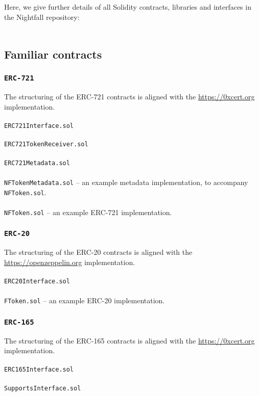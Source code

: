 \documentclass{article}
\begin{document}
Here, we give further details of all Solidity contracts, libraries and interfaces in the Nightfall repository:\\
\\
\subsection{Familiar contracts}

\subsubsection{\texttt{ERC-721}}
The structuring of the ERC-721 contracts is aligned with the \url{https://0xcert.org} implementation.\\
\\
\texttt{ERC721Interface.sol}\\
\\
\texttt{ERC721TokenReceiver.sol}\\
\\
\texttt{ERC721Metadata.sol}\\
\\
\texttt{NFTokenMetadata.sol} -- an example metadata implementation, to accompany \texttt{NFToken.sol}.\\
\\
\texttt{NFToken.sol} -- an example ERC-721 implementation.\\

\subsubsection{\texttt{ERC-20}}
The structuring of the ERC-20 contracts is aligned with the \url{https://openzeppelin.org} implementation.\\
\\
\texttt{ERC20Interface.sol}\\
\\
\texttt{FToken.sol} -- an example ERC-20 implementation.\\

\subsubsection{\texttt{ERC-165}}
The structuring of the ERC-165 contracts is aligned with the \url{https://0xcert.org} implementation.\\
\\
\texttt{ERC165Interface.sol}\\
\\
\texttt{SupportsInterface.sol}\\
\end{document}
